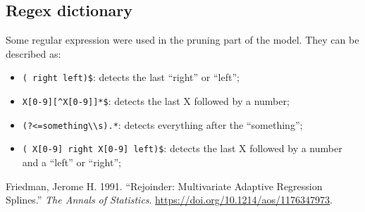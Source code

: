 \documentclass[]{article}
\providecommand{\tightlist}{%
  \setlength{\itemsep}{0pt}\setlength{\parskip}{0pt}}
\begin{document}
\hypertarget{regex-dictionary}{%
\subsection{Regex dictionary}\label{regex-dictionary}}

Some regular expression were used in the pruning part of the model. They
can be described as:

\begin{itemize}
\tightlist
\item
  \texttt{\textquotesingle{}(\ right\textbar{}\ left)\$\textquotesingle{}}:
  detects the last ``right'' or ``left'';
\item
  \texttt{\textquotesingle{}X{[}0-9{]}{[}\^{}X{[}0-9{]}{]}*\$\textquotesingle{}}:
  detects the last X followed by a number;
\item
  \texttt{\textquotesingle{}(?\textless{}=\textquotesingle{}something\textquotesingle{}\textbackslash{}\textbackslash{}s).*\textquotesingle{}}:
  detects everything after the ``something'';
\item
  \texttt{\textquotesingle{}(\ X{[}0-9{]}\ right\textbar{}\ X{[}0-9{]}\ left)\$\textquotesingle{}}:
  detects the last X followed by a number and a ``left'' or ``right'';
\end{itemize}

\hypertarget{refs}{}
\leavevmode\hypertarget{ref-Friedman1991}{}%
Friedman, Jerome H. 1991. ``Rejoinder: Multivariate Adaptive Regression
Splines.'' \emph{The Annals of Statistics}.
\url{https://doi.org/10.1214/aos/1176347973}.
\end{document}
